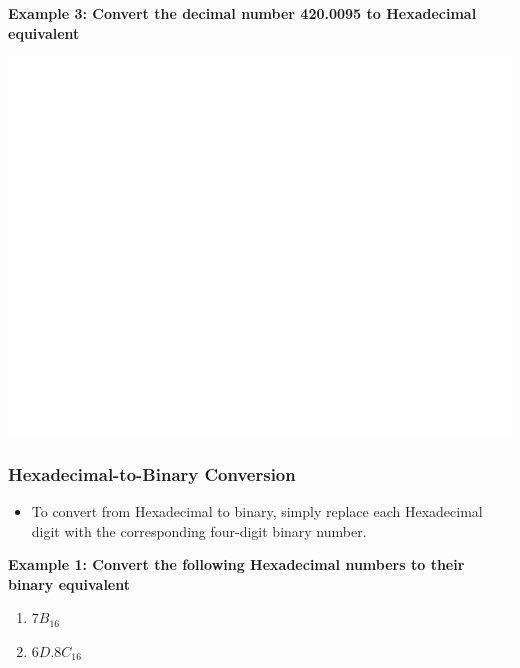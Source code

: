 \documentclass[]{book}
\providecommand{\tightlist}{%
  \setlength{\itemsep}{0pt}\setlength{\parskip}{0pt}}
\begin{document}
\textbf{Example 3: Convert the decimal number 420.0095 to Hexadecimal equivalent}

\begin{center}\includegraphics[width=1\linewidth]{figure/NSbox17-1} \end{center}

\hypertarget{hexadecimal-to-binary-conversion}{%
\subsubsection{Hexadecimal-to-Binary Conversion}\label{hexadecimal-to-binary-conversion}}

\begin{itemize}
\tightlist
\item
  To convert from Hexadecimal to binary, simply replace each Hexadecimal digit with the corresponding four-digit binary number.
\end{itemize}

\textbf{Example 1: Convert the following Hexadecimal numbers to their binary equivalent}

\begin{enumerate}
\def\labelenumi{(\alph{enumi})}
\tightlist
\item
  \(7B_{16}\)
\item
  \(6D.8C_{16}\)
\end{enumerate}
\end{document}
